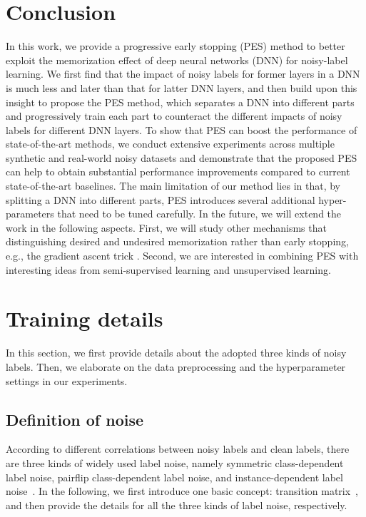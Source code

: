 \documentclass[11pt]{article}
\begin{document}
\section{Conclusion}
\label{sec:con}
In this work, we provide a progressive early stopping (PES) method to better exploit the memorization effect of deep neural networks (DNN) for noisy-label learning. We first find that the impact of noisy labels for former layers in a DNN is much less and later than that for latter DNN layers, and then build upon this insight to propose the PES method, which separates a DNN into different parts and progressively train each part to counteract the different impacts of noisy labels for different DNN layers. To show that PES can boost the performance of state-of-the-art methods, we conduct extensive experiments across multiple synthetic and real-world noisy datasets and demonstrate that the proposed PES can help to obtain substantial performance improvements compared to current state-of-the-art baselines. 
The main limitation of our method lies in that, by splitting a DNN into different parts, PES introduces several additional hyper-parameters that need to be tuned carefully. 
In the future, we will extend the work in the following aspects. First, we will study other mechanisms that distinguishing desired and undesired memorization rather than early stopping, e.g., the gradient ascent trick \cite{han2020SIGUA}. Second, we are interested in combining PES with interesting ideas from semi-supervised learning and unsupervised learning.




\newpage




\newpage
\appendix

\section{Training details}
In this section, we first provide details about the adopted three kinds of noisy labels. Then, we elaborate on the data preprocessing and the hyperparameter settings in our experiments.

\subsection{Definition of noise}
According to different correlations between noisy labels and clean labels, there are three kinds of widely used label noise, namely symmetric class-dependent label noise, pairflip class-dependent label noise, and instance-dependent label noise~\cite{Patrini2017forward, han2018co, xia2020parts}. In the following, we first introduce one basic concept: transition matrix~\cite{Patrini2017forward}, and then provide the details for all the three kinds of label noise, respectively. 
\end{document}
